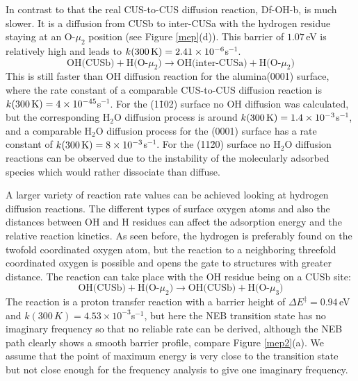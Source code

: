 \documentclass[11pt,DIV=13,BCOR=5mm,a4paper,headinclude]{scrbook}
\begin{document}
In contrast to that the real CUS-to-CUS diffusion reaction, Df-OH-b, is much slower.
It is a diffusion from CUSb to inter-CUSa with the hydrogen residue staying at an O-$\mu_2$ position (see Figure \ref{mep}(d)).
This barrier of $1.07\,$eV is relatively high and leads to $k(\textrm{300\,K})=2.41\times 10^{-6}$s$^{-1}$.
\begin{equation}
 \text{OH(CUSb)} + \text{H(O-$\mu_2$)} \rightarrow \text{OH(inter-CUSa)} + \text{H(O-$\mu_2$)} \tag{Df-OH-b}
     \label{diffOHb}
\end{equation}
This is still faster than OH diffusion reaction for the alumina(0001) surface\cite{WirthJPCC2012,Wirth2014thesis}, where the rate constant of a comparable CUS-to-CUS diffusion reaction is $k(\textrm{300\,K})=4\times 10^{-45}$s$^{-1}$.
For the (1\=102) surface no OH diffusion was calculated, but the corresponding H$_2$O diffusion process is around $k(\textrm{300\,K})=1.4\times 10^{-3}$s$^{-1}$, and a comparable H$_2$O diffusion process for the (0001) surface has a rate constant of $k(\textrm{300\,K})=8\times 10^{-3}$s$^{-1}$.
For the (11\=20) surface no H$_2$O diffusion reactions can be observed due to the instability of the molecularly adsorbed species which would rather dissociate than diffuse.


A larger variety of reaction rate values can be achieved looking at hydrogen diffusion reactions.
The different types of surface oxygen atoms and also the distances between OH and H residues can affect the adsorption energy and the relative reaction kinetics.
As seen before, the hydrogen is preferably found on the twofold coordinated oxygen atom, but the reaction to a neighboring threefold coordinated oxygen is possible and opens the gate to structures with greater distance.
The reaction can take place with the OH residue being on a CUSb site:
\begin{equation}
 \text{OH(CUSb)} + \text{H(O-$\mu_2$)} \rightarrow \text{OH(CUSb)} + \text{H(O-$\mu_3$)} \tag{Df-H-a}
     \label{diffHa}
\end{equation}
The reaction is a proton transfer reaction with a barrier height of $\Delta E^\ddagger=0.94\,$eV and $k(300\,K)=4.53\times 10^{-3}$s$^{-1}$, but here the NEB transition state has no imaginary frequency so that no reliable rate can be derived, although the NEB path clearly shows a smooth barrier profile, compare Figure \ref{mep2}(a).
We assume that the point of maximum energy is very close to the transition state but not close enough for the frequency analysis to give one imaginary frequency.
\end{document}
